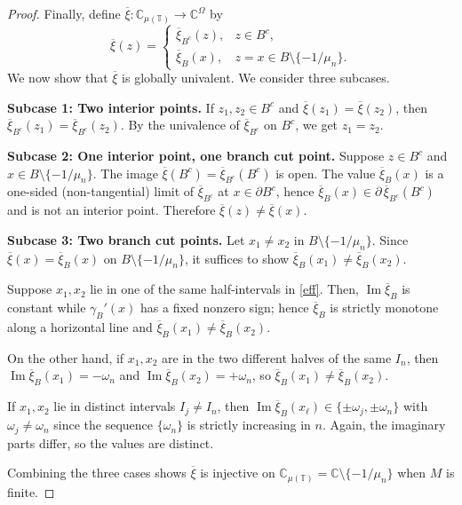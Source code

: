 \documentclass[reqno]{amsart}
\begin{document}
\begin{proof}
Finally, define $\overline{\xi}:\mathbb{C}_{\mu(\mathbb{T})} \to \mathbb{C}^{\Omega}$ by
 $$
 \overline{\xi}(z)=
 \begin{cases}
 \overline{\xi}_{B^c}(z), & z\in B^c,\\[2pt]
 \overline{\xi}_B(x), & z=x\in B\setminus\{-1/\mu_n\}.
 \end{cases}
 $$
We now show that $\overline{\xi}$ is globally univalent. We consider three subcases.
\smallskip

\noindent\textbf{Subcase 1: Two interior points.}
If $z_1,z_2\in B^c$ and $\overline{\xi}(z_1)=\overline{\xi}(z_2)$, then
$\overline{\xi}_{B^c}(z_1)=\overline{\xi}_{B^c}(z_2)$. By the univalence of $\overline{\xi}_{B^c}$ on
$B^c$, we get $z_1=z_2$.
\smallskip

\noindent\textbf{Subcase 2: One interior point, one branch cut point.}
Suppose $z\in B^c$ and $x\in B\setminus\{-1/\mu_n\}$.
The image $\overline{\xi}(B^c)=\overline{\xi}_{B^c}(B^c)$ is open.
The value $\overline{\xi}_B(x)$ is a one-sided (non-tangential) limit of $\overline{\xi}_{B^c}$
at $x\in\partial B^c$,
hence $\overline{\xi}_B(x)\in\partial\,\overline{\xi}_{B^c}(B^c)$ and is not an interior point.
Therefore $\overline{\xi}(z)\neq \overline{\xi}(x)$.
\smallskip

\noindent\textbf{Subcase 3: Two branch cut points.}
Let $x_1\neq x_2$ in $B\setminus\{-1/\mu_n\}$. Since $\overline{\xi}(x)=\overline{\xi}_B(x)$ on
$B\setminus\{-1/\mu_n\}$, it suffices to show $\overline{\xi}_B(x_1)\neq \overline{\xi}_B(x_2)$.

Suppose $x_1,x_2$ lie in one of the same half-intervals in \eqref{eff}.
Then, $\operatorname{Im} \overline{\xi}_B$ is constant while $\gamma_B'(x)$ has a fixed nonzero sign;
 hence $\overline{\xi}_B$ is strictly monotone along a horizontal line and
$\overline{\xi}_B(x_1)\neq \overline{\xi}_B(x_2)$.

On the other hand, if $x_1,x_2$ are in the two different halves of the same $I_n$,
then $\operatorname{Im} \overline{\xi}_B(x_1)=-\omega_n$ and $\operatorname{Im} \overline{\xi}_B(x_2)=+\omega_n$, so
$\overline{\xi}_B(x_1)\neq \overline{\xi}_B(x_2)$.

If $x_1,x_2$ lie in distinct intervals $I_j\neq I_n$, then
$\operatorname{Im} \overline{\xi}_B(x_\ell)\in\{\pm \omega_j,\pm \omega_n\}$ with $\omega_j\neq \omega_n$
since the sequence $\{\omega_n\}$ is strictly increasing in $n$. Again, the imaginary
parts differ, so the values are distinct.

Combining the three cases shows $\overline{\xi}$ is injective on
$\mathbb{C}_{\mu(\mathbb{T})} = \mathbb{C}\setminus\{-1/\mu_n\}$ when $M$ is finite.
\smallskip


\end{proof}
\end{document}
